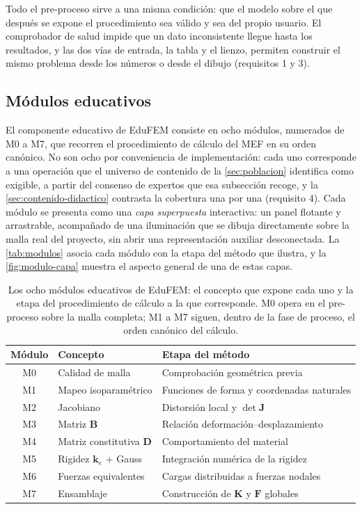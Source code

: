 Todo el pre-proceso sirve a una misma condición: que el modelo sobre el que después se expone el procedimiento sea válido y sea del propio usuario. El comprobador de salud impide que un dato inconsistente llegue hasta los resultados, y las dos vías de entrada, la tabla y el lienzo, permiten construir el mismo problema desde los números o desde el dibujo (requisitos 1 y 3).

\subsection{Módulos educativos}
\label{sec:educacion}

El componente educativo de EduFEM consiste en ocho módulos, numerados de M0 a M7, que recorren el procedimiento de cálculo del MEF en su orden canónico. No son ocho por conveniencia de implementación: cada uno corresponde a una operación que el universo de contenido de la \autoref{sec:poblacion} identifica como exigible, a partir del consenso de expertos que esa subsección recoge, y la \autoref{sec:contenido-didactico} contrasta la cobertura una por una (requisito 4). Cada módulo se presenta como una \emph{capa superpuesta} interactiva: un panel flotante y arrastrable, acompañado de una iluminación que se dibuja directamente sobre la malla real del proyecto, sin abrir una representación auxiliar desconectada. La \autoref{tab:modulos} asocia cada módulo con la etapa del método que ilustra, y la \autoref{fig:modulo-capa} muestra el aspecto general de una de estas capas.

\begin{table}[H]
\centering
\caption[Los ocho módulos educativos de EduFEM.]{Los ocho módulos educativos de EduFEM: el concepto que expone cada uno y la etapa del procedimiento de cálculo a la que corresponde. M0 opera en el pre-proceso sobre la malla completa; M1 a M7 siguen, dentro de la fase de proceso, el orden canónico del cálculo.}
\label{tab:modulos}
\begin{tabular}{@{}cll@{}}
\toprule
\textbf{Módulo} & \textbf{Concepto} & \textbf{Etapa del método} \\
\midrule
M0 & Calidad de malla        & Comprobación geométrica previa \\
M1 & Mapeo isoparamétrico    & Funciones de forma y coordenadas naturales \\
M2 & Jacobiano               & Distorsión local y $\det\bm{J}$ \\
M3 & Matriz $\bm{B}$         & Relación deformación--desplazamiento \\
M4 & Matriz constitutiva $\bm{D}$ & Comportamiento del material \\
M5 & Rigidez $\bm{k}_e$ + Gauss & Integración numérica de la rigidez \\
M6 & Fuerzas equivalentes    & Cargas distribuidas a fuerzas nodales \\
M7 & Ensamblaje              & Construcción de $\bm{K}$ y $\bm{F}$ globales \\
\bottomrule
\end{tabular}
\end{table}

